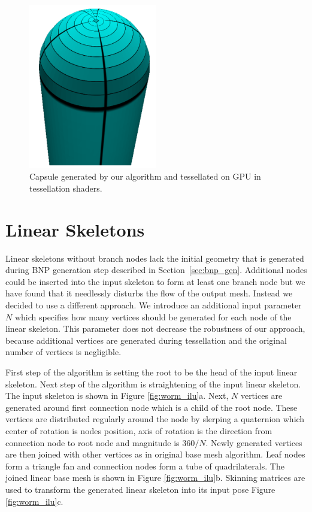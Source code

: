 \begin{figure}[ht]
    \centering
    \includegraphics[width=0.5\textwidth]{images/capsule}
    \caption[Capsule generation]{Capsule generated by our algorithm and tessellated on GPU in tessellation shaders.}
    \label{fig:capsule_ilu}
\end{figure}

\section{Linear Skeletons}
Linear skeletons without branch nodes lack the initial geometry that is generated during BNP generation step described in Section~\ref{sec:bnp_gen}.
Additional nodes could be inserted into the input skeleton to form at least one branch node but we have found that it needlessly disturbs the flow of the output mesh.
Instead we decided to use a different approach.
We introduce an additional input parameter $N$ which specifies how many vertices should be generated for each node of the linear skeleton.
This parameter does not decrease the robustness of our approach, because additional vertices are generated during tessellation and the original number of vertices is negligible.

First step of the algorithm is setting the root to be the head of the input linear skeleton.
Next step of the algorithm is straightening of the input linear skeleton.
The input skeleton is shown in Figure \ref{fig:worm_ilu}a.
Next, $N$ vertices are generated around first connection node which is a child of the root node.
These vertices are distributed regularly around the node by slerping a quaternion which center of rotation is nodes position, axis of rotation is the direction from connection node to root node and magnitude is $360/N$.
Newly generated vertices are then joined with other vertices as in original base mesh algorithm.
Leaf nodes form a triangle fan and connection nodes form a tube of quadrilaterals.
The joined linear base mesh is shown in Figure \ref{fig:worm_ilu}b.
Skinning matrices are used to transform the generated linear skeleton into its input pose Figure \ref{fig:worm_ilu}c.

